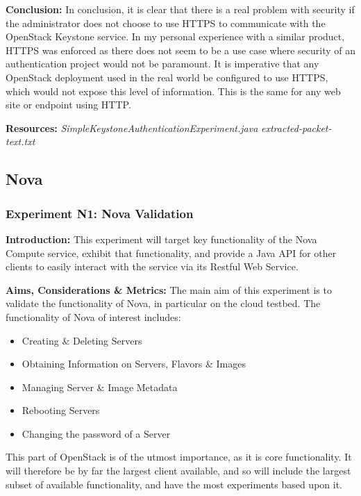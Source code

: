 \textbf{Conclusion:}
In conclusion, it is clear that there is a real problem with security if the administrator does not choose to use HTTPS to communicate with the OpenStack Keystone service. In my personal experience with a similar product, HTTPS was enforced as there does not seem to be a use case where security of an authentication project would not be paramount. It is imperative that any OpenStack deployment used in the real world be configured to use HTTPS, which would not expose this level of information. This is the same for any web site or endpoint using HTTP. 

\textbf{Resources:}
\textit{SimpleKeystoneAuthenticationExperiment.java}
\textit{extracted-packet-text.txt}



\subsection{Nova}

\subsubsection{Experiment N1: Nova Validation}

\textbf{Introduction:}
This experiment will target key functionality of the Nova Compute service, exhibit that functionality, and provide a Java API for other clients to easily interact with the service via its Restful Web Service. 

\textbf{Aims, Considerations \& Metrics:}
The main aim of this experiment is to validate the functionality of Nova, in particular on the cloud testbed. The functionality of Nova of interest includes:

\begin{itemize}
\itemsep0em
\item Creating \& Deleting Servers
\item Obtaining Information on Servers, Flavors \& Images
\item Managing Server \& Image Metadata
\item Rebooting Servers
\item Changing the password of a Server
\end{itemize}

This part of OpenStack is of the utmost importance, as it is core functionality. It will therefore be by far the largest client available, and so will include the largest subset of available functionality, and have the most experiments based upon it. 

